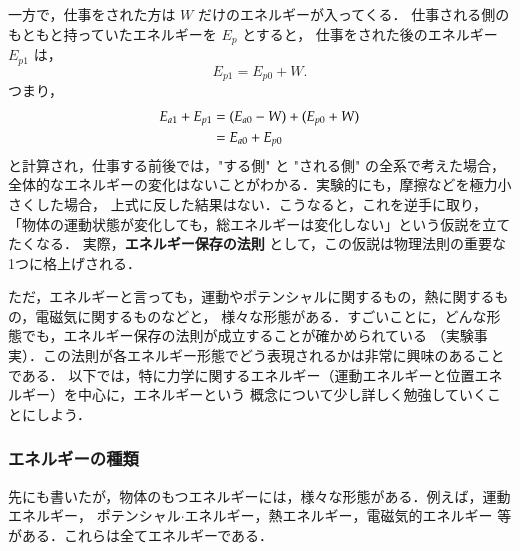                                 一方で，仕事をされた方は $W$ だけのエネルギーが入ってくる．
                                仕事される側のもともと持っていたエネルギーを $E_{p}$ とすると，
                                仕事をされた後のエネルギー $E_{p1}$ は，
                                        \begin{equation*}
                                                E_{p1} = E_{p0}+W.
                                        \end{equation*}
                                つまり，
                                        \begin{align}
                                                E_{a1} + E_{p1} &= (E_{a0}-W) + (E_{p0}+W)  \notag \\
                                                                &= E_{a0} + E_{p0}
                                        \end{align}
                                と計算され，仕事する前後では，"する側" と "される側" の全系で考えた場合，
                                全体的なエネルギーの変化はないことがわかる．実験的にも，摩擦などを極力小さくした場合，
                                上式に反した結果はない．こうなると，これを逆手に取り，
                                「物体の運動状態が変化しても，総エネルギーは変化しない」という仮説を立てたくなる．
                                実際，\textbf{エネルギー保存の法則} として，この仮説は物理法則の重要な1つに格上げされる．

                                ただ，エネルギーと言っても，運動やポテンシャルに関するもの，熱に関するもの，電磁気に関するものなどと，
                                様々な形態がある．すごいことに，どんな形態でも，エネルギー保存の法則が成立することが確かめられている
                                （実験事実）．この法則が各エネルギー形態でどう表現されるかは非常に興味のあることである．
                                以下では，特に力学に関するエネルギー（運動エネルギーと位置エネルギー）を中心に，エネルギーという
                                概念について少し詳しく勉強していくことにしよう．

            \subsubsection{エネルギーの種類}
                先にも書いたが，物体のもつエネルギーには，様々な形態がある．例えば，運動エネルギー，
                ポテンシャル$\cdot$エネルギー，熱エネルギー，電磁気的エネルギー 等がある．これらは全てエネルギーである．

